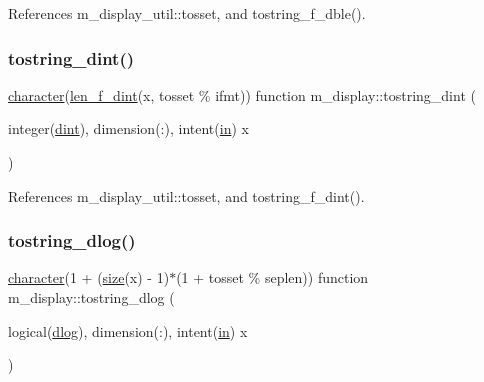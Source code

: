 References m\+\_\+display\+\_\+util\+::tosset, and tostring\+\_\+f\+\_\+dble().

\mbox{\label{namespacem__display_a5a8479cdf49ed905e9c54cc2f86cea16}} 
\subsubsection{\texorpdfstring{tostring\+\_\+dint()}{tostring\_dint()}}
{\footnotesize\ttfamily \hyperlink{option__stopwatch_83_8txt_abd4b21fbbd175834027b5224bfe97e66}{character}(\hyperlink{namespacem__display_a6a2709cf5f243ee492f223b40c6b5143}{len\+\_\+f\+\_\+dint}(x, tosset \% ifmt)) function m\+\_\+display\+::tostring\+\_\+dint (\begin{DoxyParamCaption}\item[{integer(\hyperlink{namespacem__display_a73f772e9702cad6f40b78364fde2c7cd}{dint}), dimension(\+:), intent(\hyperlink{M__journal_83_8txt_afce72651d1eed785a2132bee863b2f38}{in})}]{x }\end{DoxyParamCaption})\hspace{0.3cm}{\ttfamily [private]}}



References m\+\_\+display\+\_\+util\+::tosset, and tostring\+\_\+f\+\_\+dint().

\mbox{\label{namespacem__display_ac4b7da9242ea26fd744e1301444d374a}} 
\subsubsection{\texorpdfstring{tostring\+\_\+dlog()}{tostring\_dlog()}}
{\footnotesize\ttfamily \hyperlink{option__stopwatch_83_8txt_abd4b21fbbd175834027b5224bfe97e66}{character}(1 + (\hyperlink{what__overview_81_8txt_ab5692ed87074f1d5ec850a9ffa8b5af9}{size}(x) -\/ 1)$\ast$(1 + tosset \% seplen)) function m\+\_\+display\+::tostring\+\_\+dlog (\begin{DoxyParamCaption}\item[{logical(\hyperlink{namespacem__display_a8c6a3df510feabf6bc84dd0a8789f98c}{dlog}), dimension(\+:), intent(\hyperlink{M__journal_83_8txt_afce72651d1eed785a2132bee863b2f38}{in})}]{x }\end{DoxyParamCaption})\hspace{0.3cm}{\ttfamily [private]}}



